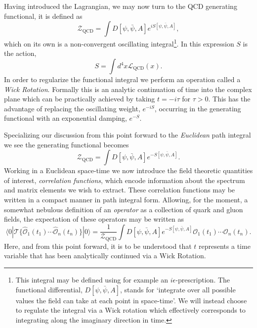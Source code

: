Having introduced the Lagrangian, we may now turn to the QCD generating functional, it is defined as
\begin{equation*}
\mathcal{Z}_{\mathrm{QCD}} = \int D[\psi,\bar{\psi},A] e^{iS[\psi,\bar{\psi},A]},
\end{equation*} 
which on its own is a non-convergent oscillating integral\footnote{This integral may be defined using for example an $i\epsilon$-prescription. The functional differential, $D[\psi,\bar{\psi},A]$, stands for `integrate over all possible values the field can take at each point in space-time'. We will instead choose to regulate the integral via a Wick rotation which effectively corresponds to integrating along the imaginary direction in time.}. In this expression $S$ is the action, 
\begin{equation*}
S = \int d^4x \mathcal{L}_{\mathrm{QCD}}(x).
\end{equation*}
In order to regularize the functional integral we perform an operation called a \emph{Wick Rotation}. Formally this is an analytic continuation of time into the complex plane which can be practically achieved by taking $t=-i\tau$ for $\tau >0$. This has the advantage of replacing the oscillating weight, $e^{-iS}$, occurring in the generating functional with an exponential damping, $e^{-S}$. 

Specializing our discussion from this point forward to the \emph{Euclidean} path integral  we see the generating functional becomes 
\begin{equation}
\mathcal{Z}_{\mathrm{QCD}} = \int D[\psi,\bar{\psi},A] e^{-S[\psi,\bar{\psi},A]}. 
\end{equation} 
Working in a Euclidean space-time we now introduce the field theoretic quantities of interest, \emph{correlation functions}, which encode information about the spectrum and matrix elements we wish to extract. These correlation functions may be written in a compact manner in path integral form. Allowing, for the moment, a somewhat nebulous definition of an \emph{operator} as a collection of quark and gluon fields, the expectation of these operators may be written as
\begin{equation*}
\langle 0 | \mathcal{T}\{ \hat{\mathcal{O}}_1(t_1) \cdots \hat{\mathcal{O}}_n(t_n) \} | 0 \rangle =  \frac{1}{\mathcal{Z}_{\mathrm{QCD}}}\int D[\psi,\bar{\psi},A] e^{-S[\psi,\bar{\psi},A]} \mathcal{O}_1(t_1)\cdots \mathcal{O}_n(t_n). 
\end{equation*}
Here, and from this point forward, it is to be understood that $t$ represents a time variable that has been analytically continued via a Wick Rotation. 

